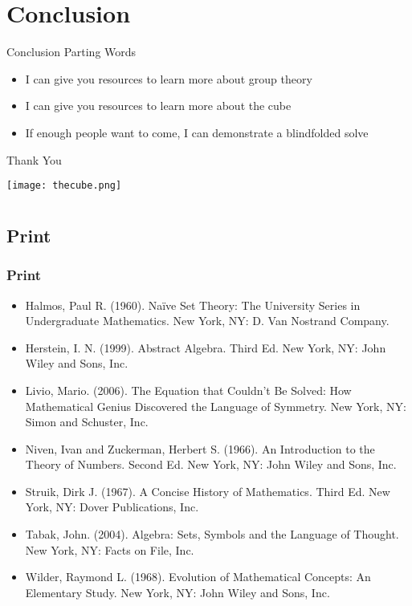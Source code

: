 \documentclass{beamer}
\begin{document}
		\section*{Conclusion}

				\begin{frame}{Conclusion}
					Parting Words \\[.2cm]
					\begin{itemize}
						\item I can give you resources to learn more about group theory
						\item I can give you resources to learn more about the cube
						\item If enough people want to come, I can demonstrate a blindfolded solve
					\end{itemize}
				\end{frame}

				\begin{frame}{Thank You}
					\begin{center}
					\texttt{[image: thecube.png]}
					\end{center}
				\end{frame}

	\appendix

		\section{\appendixname}
			
			\subsection{Print}
				
				\begin{frame}[allowframebreaks]
				\frametitle<presentation>{Print}
				\begin{itemize}
				\item Halmos, Paul R. (1960). Naïve Set Theory: The University Series in Undergraduate Mathematics. New York, NY: D. Van Nostrand Company.
				\item Herstein, I. N. (1999). Abstract Algebra. Third Ed. New York, NY: John Wiley and Sons, Inc.
				\item Livio, Mario. (2006). The Equation that Couldn’t Be Solved: How Mathematical Genius Discovered the Language of Symmetry. New York, NY: Simon and Schuster, Inc.
				\item Niven, Ivan and Zuckerman, Herbert S. (1966). An Introduction to the Theory of Numbers. Second Ed. New York, NY: John Wiley and Sons, Inc.
				\item Struik, Dirk J. (1967). A Concise History of Mathematics. Third Ed. New York, NY: Dover Publications, Inc.
				\item Tabak, John. (2004). Algebra: Sets, Symbols  and the Language of Thought. New York, NY: Facts on File, Inc.
				\item Wilder, Raymond L. (1968). Evolution of Mathematical Concepts: An Elementary Study. New York, NY: John Wiley and Sons, Inc.
				\end{itemize}
				\end{frame}
\end{document}
